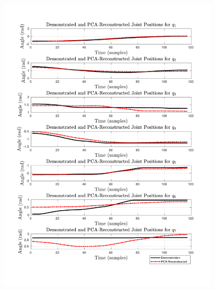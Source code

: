 \documentclass{article}
\begin{document}
\begin{figure}[!th] 
  \begin{minipage}{0.485\textwidth}
     	\centering 
     	\includegraphics[trim={1.2cm 1.5cm 1.7cm 1.5cm},clip,width=\linewidth]{../../src/JTDS_mat_lib/figures/pca_pos_pour1.pdf}
  \end{minipage}
    \begin{minipage}{0.5\textwidth}
       	\centering 

\end{minipage}
\end{figure}
\end{document}
